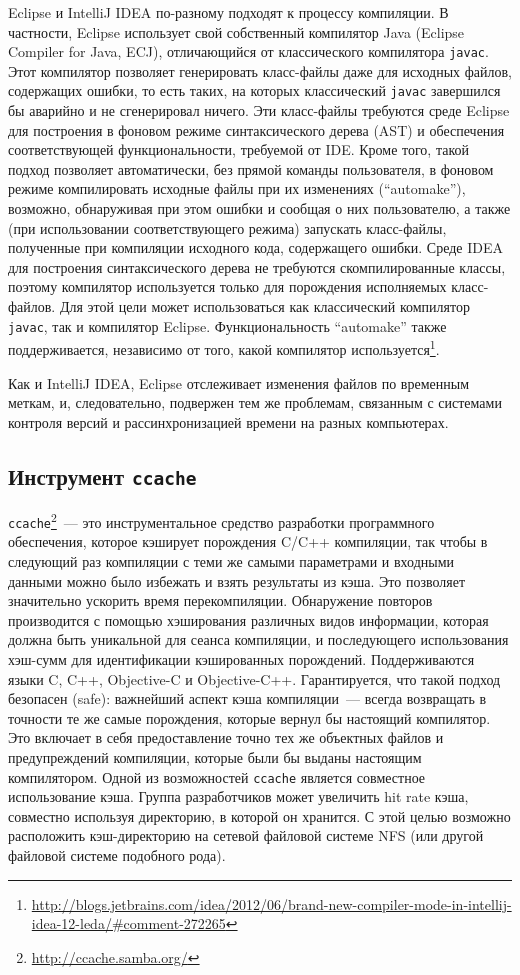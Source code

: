 Eclipse и IntelliJ IDEA по-разному подходят к процессу компиляции. В частности, Eclipse использует свой собственный компилятор Java (Eclipse Compiler for Java, ECJ), отличающийся от классического компилятора \texttt{javac}. Этот компилятор позволяет генерировать класс-файлы даже для исходных файлов, содержащих ошибки, то есть таких, на которых классический \texttt{javac} завершился бы аварийно и не сгенерировал ничего. Эти класс-файлы требуются среде Eclipse для построения в фоновом режиме синтаксического дерева (AST) и обеспечения соответствующей функциональности, требуемой от IDE. Кроме того, такой подход позволяет автоматически, без прямой команды пользователя, в фоновом режиме компилировать исходные файлы при их изменениях (``automake''), возможно, обнаруживая при этом ошибки и сообщая о них пользователю, а также (при использовании соответствующего режима) запускать класс-файлы, полученные при компиляции исходного кода, содержащего ошибки.
Среде IDEA для построения синтаксического дерева не требуются скомпилированные классы, поэтому компилятор используется только для порождения исполняемых класс-файлов. Для этой цели может использоваться как классический компилятор \texttt{javac}, так и компилятор Eclipse. Функциональность ``automake'' также поддерживается, независимо от того, какой компилятор используется\footnote{\url{http://blogs.jetbrains.com/idea/2012/06/brand-new-compiler-mode-in-intellij-idea-12-leda/\#comment-272265}}.

Как и IntelliJ IDEA, Eclipse отслеживает изменения файлов по временным меткам, и, следовательно, подвержен тем же проблемам, связанным с системами контроля версий и рассинхронизацией времени на разных компьютерах.

\subsection{Инструмент \texttt{ccache}}
\texttt{ccache}\footnote{\url{http://ccache.samba.org/}}~--- это инструментальное средство разработки программного обеспечения, которое кэширует порождения C/C++ компиляции, так чтобы в следующий раз компиляции с теми же самыми параметрами и входными данными можно было избежать и взять результаты из кэша. Это позволяет значительно ускорить время перекомпиляции. Обнаружение повторов производится с помощью хэширования различных видов информации, которая должна быть уникальной для сеанса компиляции, и последующего использования хэш-сумм для идентификации кэшированных порождений. Поддерживаются языки C, C++, Objective-C и Objective-C++. Гарантируется, что такой подход безопасен (safe): важнейший аспект кэша компиляции~--- всегда возвращать в точности те же самые порождения, которые вернул бы настоящий компилятор. Это включает в себя предоставление точно тех же объектных файлов и предупреждений компиляции, которые были бы выданы настоящим компилятором.
Одной из возможностей \texttt{ccache} является совместное использование кэша. Группа разработчиков может увеличить hit rate кэша, совместно используя директорию, в которой он хранится. С этой целью возможно расположить кэш-директорию на сетевой файловой системе NFS (или другой файловой системе подобного рода).

